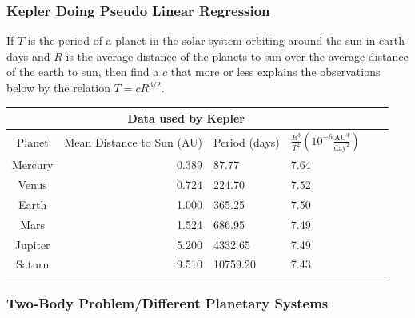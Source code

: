     \begin{frame}
      \frametitle{Kepler Doing Pseudo Linear Regression}
      \pause
      \begin{Pro}
      If $T$ is the period of a planet in the solar system orbiting around the sun in earth-days and 
      $R$ is the average distance of the planets to sun over the average distance of the earth to sun,
        then find a $c$ that more or less explains 
      the observations below by the relation $T=cR^{3/2}$.
      \end{Pro}
      \pause
      \begin{tabular}{|c|r|p{1.3cm}|p{2cm}|p{2cm}|p{2cm}|}
        \hline
        \multicolumn{4}{|c|}{Data used by Kepler} \\
        \hline
        Planet & Mean Distance to Sun (AU) & Period (days) & $\frac{R^3}{T^2}(10^{-6}\frac{\text{AU}^3}{\text{day}^2})$ \\
        \hline
        Mercury & 0.389 & 87.77    & 7.64 \\
        Venus   & 0.724 & 224.70   & 7.52 \\
        Earth   & 1.000 & 365.25   & 7.50 \\
        Mars    & 1.524 & 686.95   & 7.49 \\
        Jupiter & 5.200 & 4332.65  & 7.49 \\
        Saturn  & 9.510 & 10759.20 & 7.43 \\
        \hline
        \end{tabular}\label{tab:kepler_tycho_data}
      \end{frame}
  
  
  
  
          \begin{frame}
            \frametitle{Two-Body Problem/Different Planetary Systems}
            \end{frame}

